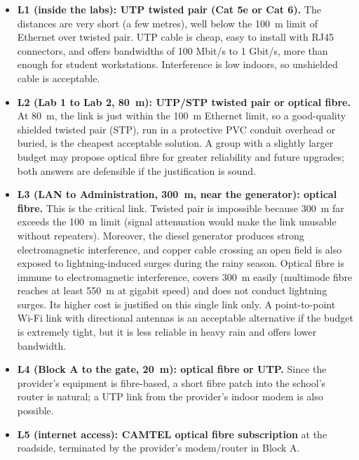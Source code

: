 \documentclass[11pt]{article}
\begin{document}
\begin{itemize}
\item \textbf{L1 (inside the labs): UTP twisted pair (Cat 5e or Cat 6).} The distances are very short (a few metres), well below the \SI{100}{m} limit of Ethernet over twisted pair. UTP cable is cheap, easy to install with RJ45 connectors, and offers bandwidths of 100 Mbit/s to 1 Gbit/s, more than enough for student workstations. Interference is low indoors, so unshielded cable is acceptable.

\item \textbf{L2 (Lab 1 to Lab 2, \SI{80}{m}): UTP/STP twisted pair or optical fibre.} At \SI{80}{m}, the link is just within the \SI{100}{m} Ethernet limit, so a good-quality shielded twisted pair (STP), run in a protective PVC conduit overhead or buried, is the cheapest acceptable solution. A group with a slightly larger budget may propose optical fibre for greater reliability and future upgrades; both answers are defensible if the justification is sound.

\item \textbf{L3 (LAN to Administration, \SI{300}{m}, near the generator): optical fibre.} This is the critical link. Twisted pair is impossible because \SI{300}{m} far exceeds the \SI{100}{m} limit (signal attenuation would make the link unusable without repeaters). Moreover, the diesel generator produces strong electromagnetic interference, and copper cable crossing an open field is also exposed to lightning-induced surges during the rainy season. Optical fibre is immune to electromagnetic interference, covers \SI{300}{m} easily (multimode fibre reaches at least \SI{550}{m} at gigabit speed) and does not conduct lightning surges. Its higher cost is justified on this single link only. A point-to-point Wi-Fi link with directional antennas is an acceptable alternative if the budget is extremely tight, but it is less reliable in heavy rain and offers lower bandwidth.

\item \textbf{L4 (Block A to the gate, \SI{20}{m}): optical fibre or UTP.} Since the provider's equipment is fibre-based, a short fibre patch into the school's router is natural; a UTP link from the provider's indoor modem is also possible.

\item \textbf{L5 (internet access): CAMTEL optical fibre subscription} at the roadside, terminated by the provider's modem/router in Block A.
\end{itemize}
\end{document}

